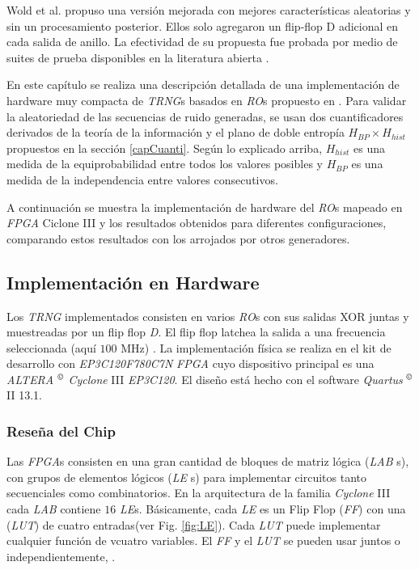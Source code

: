 Wold et al. \cite{Wold2009} propuso una versión mejorada con mejores características aleatorias y sin un procesamiento posterior.
Ellos solo agregaron un flip-flop D adicional en cada salida de anillo.
La efectividad de su propuesta fue probada por medio de suites de prueba disponibles en la literatura abierta \cite{NIST2000, marsaglia1995, NIST2000a}.

En este capítulo se realiza una descripción detallada de una implementación de hardware muy compacta de \emph{TRNG}s basados en \emph{RO}s propuesto en \cite{Wold2009}.
Para validar la aleatoriedad de las secuencias de ruido generadas, se usan dos cuantificadores derivados de la teoría de la información y el plano de doble entropía $H_{BP} \times H_{hist}$ propuestos en la sección \ref{capCuanti}.
Según lo explicado arriba, $H_{hist}$ es una medida de la equiprobabilidad entre todos los valores posibles y $H_{BP}$ es una medida de la independencia entre valores consecutivos.

A continuación se muestra la implementación de hardware del \emph{RO}s mapeado en \emph{FPGA} Ciclone III y los resultados obtenidos para diferentes configuraciones, comparando estos resultados con los arrojados por otros generadores.

\subsection{Implementación en Hardware}

Los \emph{TRNG} implementados consisten en varios \emph{RO}s con sus salidas XOR juntas y muestreadas por un flip flop \emph{D}.
El flip flop latchea la salida a una frecuencia seleccionada (aquí $ 100 $ MHz) \cite{Wold2009}.
La implementación física se realiza en el kit de desarrollo con \emph{EP3C120F780C7N} \emph{FPGA} cuyo dispositivo principal es una  \emph{ALTERA} $^{\copyright}$ \emph{Cyclone} III \emph{EP3C120}.
El diseño está hecho con el software \emph{Quartus} $^{\copyright}$ II 13.1.

\subsubsection{Reseña del Chip}

Las \emph{FPGA}s consisten en una gran cantidad de bloques de matriz lógica (\emph{LAB} s), con grupos de elementos lógicos (\emph{LE} s) para implementar circuitos tanto secuenciales como combinatorios.
En la arquitectura de la familia \emph{Cyclone} III cada \emph{LAB} contiene $16$ \emph{LE}s.
Básicamente, cada \emph{LE} es un Flip Flop (\emph{FF}) con una (\emph{LUT}) de cuatro entradas(ver Fig. \ref{fig:LE}).
Cada \emph{LUT} puede implementar cualquier función de vcuatro variables.
El \emph{FF} y el \emph{LUT} se pueden usar juntos o independientemente, \cite{Altera}.


